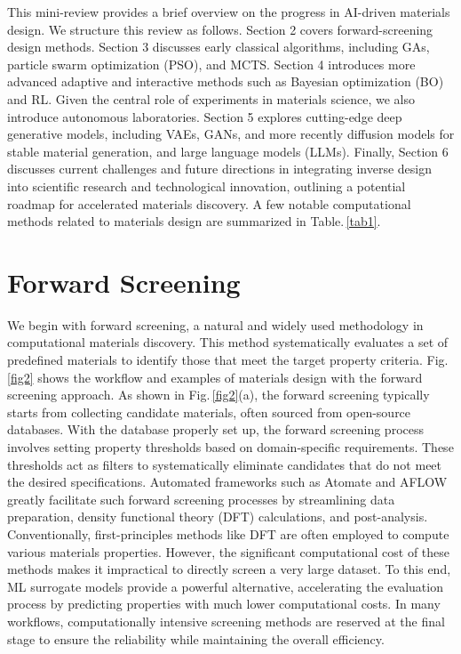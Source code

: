 \documentclass[fleqn,10pt]{wlscirep}
\begin{document}
This mini-review provides a brief overview on the progress in AI-driven materials design. We structure this review as follows. Section 2 covers forward-screening design methods. Section 3 discusses early classical algorithms, including GAs, particle swarm optimization (PSO), and MCTS. Section 4 introduces more advanced adaptive and interactive methods such as Bayesian optimization (BO) and RL. Given the central role of experiments in materials science, we also introduce autonomous laboratories. Section 5 explores cutting-edge deep generative models, including VAEs, GANs, and more recently diffusion models for stable material generation, and large language models (LLMs). Finally, Section 6 discusses current challenges and future directions in integrating inverse design into scientific research and technological innovation, outlining a potential roadmap for accelerated materials discovery. A few notable computational methods related to materials design are summarized in Table.\,\ref{tab1}. 



\section{Forward Screening}\label{fwd}
We begin with forward screening, a natural and widely used methodology in computational materials discovery. This method systematically evaluates a set of predefined materials to identify those that meet the target property criteria.
Fig.\,\ref{fig2} shows the workflow and examples of materials design with the forward screening approach. As shown in Fig.\,\ref{fig2}(a), the forward screening typically starts from collecting candidate materials, often sourced from open-source databases\cite{jain2013commentary}. 
With the database properly set up, the forward screening process involves setting property thresholds based on domain-specific requirements. These thresholds act as filters to systematically eliminate candidates that do not meet the desired specifications. 
Automated frameworks such as Atomate\cite{mathew2017atomate} and AFLOW\cite{curtarolo2012aflow} greatly facilitate such forward screening processes by streamlining data preparation,  density functional theory (DFT) calculations, and post-analysis.
Conventionally, first-principles methods like DFT are often employed to compute various materials properties. 
However, the significant computational cost of these methods makes it impractical to directly screen a very large dataset. To this end, ML surrogate models provide a powerful alternative, accelerating the evaluation process by predicting properties with much lower computational costs. In many workflows, computationally intensive screening methods are reserved at the final stage to ensure the reliability while maintaining the overall efficiency.
\end{document}
